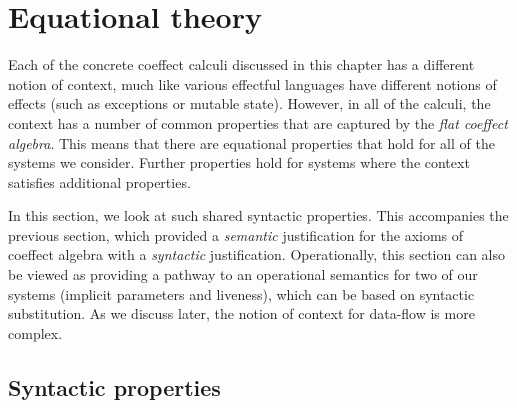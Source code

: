 \section{Equational theory}
\label{sec:flat-syntax}

Each of the concrete coeffect calculi discussed in this chapter has a different notion of context,
much like various effectful languages have different notions of effects (such as exceptions or
mutable state). However, in all of the calculi, the context has a number of common properties that 
are captured by the \emph{flat coeffect algebra}. This means that there are equational properties
that hold for all of the systems we consider. Further properties hold for systems where the context
satisfies additional properties. 

In this section, we look at such shared syntactic properties. This accompanies the previous section, 
which provided a \emph{semantic} justification for the axioms of coeffect algebra with a 
\emph{syntactic} justification. Operationally, this section can also be viewed as providing a 
pathway to an operational semantics for two of our systems (implicit parameters and liveness),
which can be based on syntactic substitution. As we discuss later, the notion of context for
data-flow is more complex.


\subsection{Syntactic properties}
\label{sec:flat-syntax-props}

